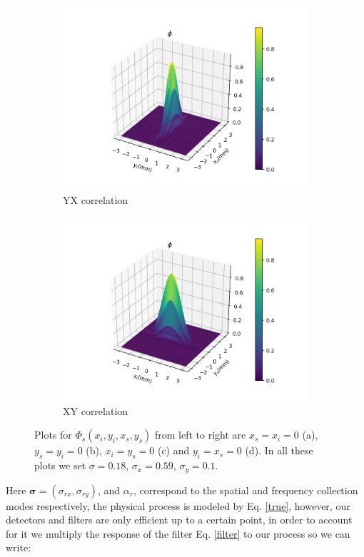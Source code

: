 \documentclass[12pt]{book}
\begin{document}
\begin{figure}[t!]
\begin{subfigure}[b]{0.45\linewidth}
\includegraphics[width=\linewidth]{images/SPDC_yx.png}
\caption{YX correlation}
\end{subfigure}
\begin{subfigure}[b]{0.45\linewidth}
\includegraphics[width=\linewidth]{images/SPDC_xy.png}
\caption{XY correlation}
\end{subfigure}
\caption{Plots for $\Phi_{s}(x_{i},y_{i},x_{s},y_{s})$  from left to right are $x_{s}=x_{i}=0$ (a), $y_{s}=y_{i}=0$ (b), $x_{i}=y_{s}=0$ (c) and $y_{i}=x_{s}=0$ (d). In all these plots we set $\sigma=0.18$, $\sigma_{x}=0.59$, $\sigma_{y}=0.1$.}
\label{SPDC}
\end{figure}

Here $\mathbf{\sigma}=(\sigma_{rx},\sigma_{ry})$, and $\alpha_{r}$, correspond to the spatial and frequency collection modes respectively, the physical process is modeled by Eq. \ref{true}, however, our detectors and filters are only efficient up to a certain point, in order to account for it we multiply the response of the filter Eq. \ref{filter} to our process so we can write:
 
\end{document}
